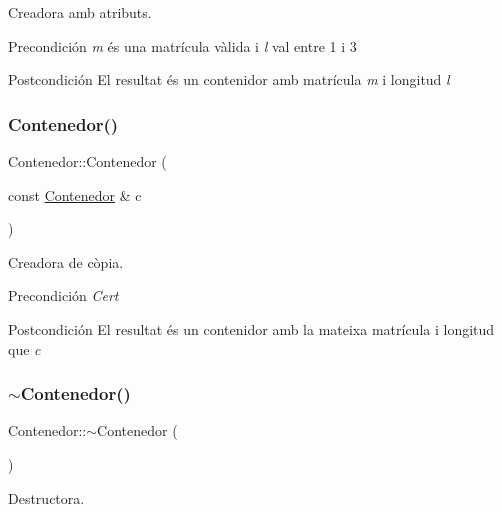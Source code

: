Creadora amb atributs. 

\begin{DoxyPrecond}{Precondición}
{\itshape m} és una matrícula vàlida i {\itshape l} val entre 1 i 3 
\end{DoxyPrecond}
\begin{DoxyPostcond}{Postcondición}
El resultat és un contenidor amb matrícula {\itshape m} i longitud {\itshape l} 
\end{DoxyPostcond}
\mbox{\label{class_contenedor_ada07edb2a23eec1f84b87b4b3de2c909}} 
\subsubsection{\texorpdfstring{Contenedor()}{Contenedor()}\hspace{0.1cm}{\footnotesize\ttfamily [3/3]}}
{\footnotesize\ttfamily Contenedor\+::\+Contenedor (\begin{DoxyParamCaption}\item[{const \hyperlink{class_contenedor}{Contenedor} \&}]{c }\end{DoxyParamCaption})}



Creadora de còpia. 

\begin{DoxyPrecond}{Precondición}
{\itshape Cert} 
\end{DoxyPrecond}
\begin{DoxyPostcond}{Postcondición}
El resultat és un contenidor amb la mateixa matrícula i longitud que {\itshape c} 
\end{DoxyPostcond}
\mbox{\label{class_contenedor_a3648194b1174752cb24967d1c53787af}} 
\subsubsection{\texorpdfstring{$\sim$\+Contenedor()}{~Contenedor()}}
{\footnotesize\ttfamily Contenedor\+::$\sim$\+Contenedor (\begin{DoxyParamCaption}{ }\end{DoxyParamCaption})}



Destructora. 

